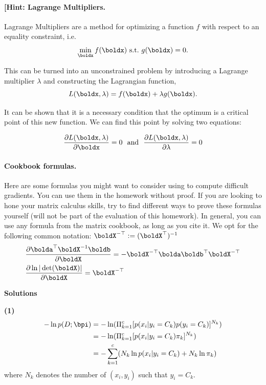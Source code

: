 \documentclass[submit]{harvardml}
\begin{document}
\begin{problem}
\paragraph{[Hint: Lagrange Multipliers.} Lagrange Multipliers are a method for
optimizing a function $f$ with respect to an
equality constraint, i.e. 
\[\min_{\boldx} f(\boldx)\ \text{s.t.}\ g(\boldx) = 0.\]

This can be turned into an unconstrained problem by introducing a
Lagrange multiplier $\lambda$ and constructing the Lagrangian function,
\[L(\boldx, \lambda) =  f(\boldx) + \lambda g(\boldx).\]

It can be shown that it is a necessary condition that the optimum 
is a critical point of this new function. We can find this point by solving two equations:

\[\frac{\partial L(\boldx, \lambda)}{\partial  \boldx} = 0  \ \ \text{and}\  \  \frac{\partial L(\boldx, \lambda)}{\partial \lambda} = 0 \]


\paragraph{Cookbook formulas.} Here are some formulas you might want to consider
using to compute difficult gradients. You can use them  in the homework
without proof. If you are looking to hone your matrix calculus skills, try to
find different ways to prove these formulas yourself (will not be part of the
evaluation of this homework). In general, you can use any formula from the matrix cookbook,
as long as you cite it. We opt for the following common notation:
$\boldX^{-\top} := (\boldX^{\top})^{-1}$
\begin{align*}
  & \frac{\partial \bolda^\top \boldX^{-1} \boldb}{\partial \boldX} = - \boldX^{-\top} \bolda \boldb^\top \boldX^{-\top} \\
  & \frac{\partial \ln | \det (\boldX) |}{\partial \boldX} = \boldX^{-\top}
 \end{align*}
 \end{problem}


\noindent\textbf{Solutions}

\noindent\textbf{(1)} 
\begin{align*}
 -\ln p(D ; \bpi) &= - \ln (\Pi_{k=1}^c  [p(x_i | y_i = C_k) p(y_i = C_k )]^{N_k} ) \\
 &= - \ln (\Pi_{k=1}^c [p(x_i | y_i = C_k) \pi_k]^{N_k} )\\ 
 &= -\sum_{k=1}^c(N_k \ln p(x_i | y_i = C_k) + 
N_k \ln \pi_k )
\end{align*}
where $N_k$ denotes the number of $(x_i, y_i)$ such that $y_i = C_k$.
\end{document}
